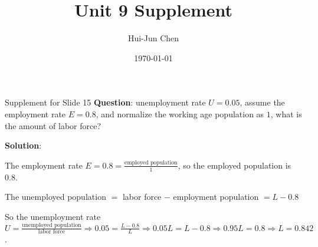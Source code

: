 \documentclass{beamer}
\title{Unit 9 Supplement}
\author{Hui-Jun Chen}
\institute{The Ohio State University}
\date{\today}
\begin{document}
\maketitle



\begin{frame}{Supplement for Slide 15}
\label{slide:Supplement_for_Slide_15}
    \textbf{Question}: unemployment rate $ U = 0.05 $, assume the employment rate $ E = 0.8 $, and normalize the working age population as $ 1 $, what is the amount of labor force?

    \textbf{Solution}:

    The employment rate $ E = 0.8 = \frac{\text{employed population}}{1}  $, so the employed population is $ 0.8 $.

    The unemployed population $ =  $ labor force $ - $ employment population $ = L - 0.8 $

    So the unemployment rate $ U = \frac{\text{unemployed population}}{\text{labor force}} \Rightarrow  0.05 = \frac{L - 0.8}{L} \Rightarrow 0.05L = L - 0.8 \Rightarrow 0.95L = 0.8 \Rightarrow L = 0.842 $.

\end{frame}




\printbibliography[heading=none]
\end{document}
